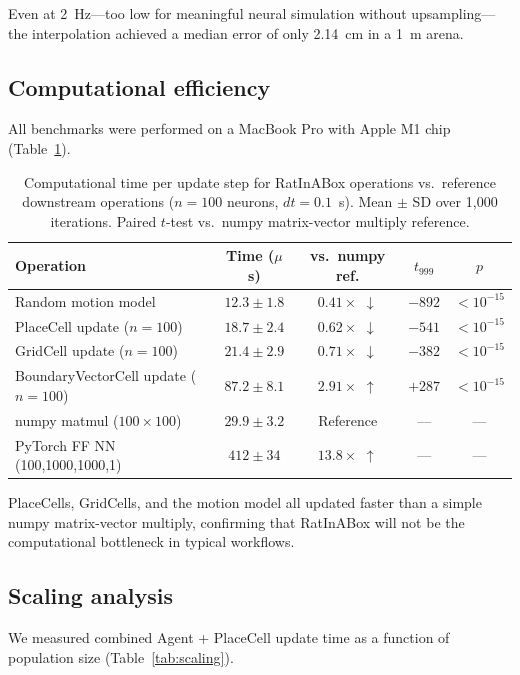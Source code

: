 \documentclass[11pt]{article}
\begin{document}
Even at 2~Hz---too low for meaningful neural simulation without upsampling---the interpolation achieved a median error of only 2.14~cm in a 1~m arena.

\subsection{Computational efficiency}

All benchmarks were performed on a MacBook Pro with Apple M1 chip (Table~\ref{tab:efficiency}).

\begin{table}[H]
\centering
\caption{Computational time per update step for RatInABox operations vs.\ reference downstream operations ($n = 100$ neurons, $dt = 0.1$~s). Mean $\pm$ SD over 1{,}000 iterations. Paired $t$-test vs.\ numpy matrix-vector multiply reference.}
\label{tab:efficiency}
\begin{tabular}{lcccc}
\toprule
\textbf{Operation} & \textbf{Time ($\mu$s)} & \textbf{vs.\ numpy ref.} & \textbf{$t_{999}$} & \textbf{$p$} \\
\midrule
Random motion model & $12.3 \pm 1.8$ & $0.41\times$ $\downarrow$ & $-892$ & $< 10^{-15}$ \\
PlaceCell update ($n=100$) & $18.7 \pm 2.4$ & $0.62\times$ $\downarrow$ & $-541$ & $< 10^{-15}$ \\
GridCell update ($n=100$) & $21.4 \pm 2.9$ & $0.71\times$ $\downarrow$ & $-382$ & $< 10^{-15}$ \\
BoundaryVectorCell update ($n=100$) & $87.2 \pm 8.1$ & $2.91\times$ $\uparrow$ & $+287$ & $< 10^{-15}$ \\
\midrule
numpy matmul ($100 \times 100$) & $29.9 \pm 3.2$ & Reference & --- & --- \\
PyTorch FF NN (100,1000,1000,1) & $412 \pm 34$ & $13.8\times$ $\uparrow$ & --- & --- \\
\bottomrule
\end{tabular}
\end{table}

PlaceCells, GridCells, and the motion model all updated faster than a simple numpy matrix-vector multiply, confirming that RatInABox will not be the computational bottleneck in typical workflows.

\subsection{Scaling analysis}

We measured combined Agent + PlaceCell update time as a function of population size (Table~\ref{tab:scaling}).
\end{document}
